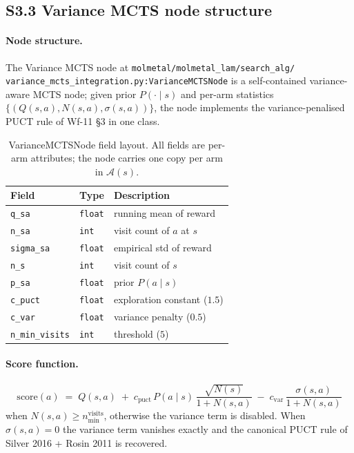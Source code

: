\subsection*{S3.3 Variance MCTS node structure}
\label{supp:s3-variance-mcts}

\paragraph{Node structure.}
The Variance MCTS node at
\texttt{molmetal/molmetal\_lam/search\_alg/
variance\_mcts\_integration.py:VarianceMCTSNode} is a
self-contained variance-aware MCTS node; given prior
$P(\cdot \mid s)$ and per-arm statistics
$\{(Q(s, a), N(s, a), \sigma(s, a))\}$, the node implements the
variance-penalised PUCT rule of Wf-11 \S 3 in one class.

\begin{table}[h]
  \centering
  \small
  \caption{VarianceMCTSNode field layout.  All fields are per-arm
  attributes; the node carries one copy per arm in $\mathcal{A}(s)$.}
  \label{tab:variance-mcts-fields}
  \begin{tabular}{lll}
    \toprule
    \textbf{Field} & \textbf{Type} & \textbf{Description} \\
    \midrule
    \texttt{q\_sa} & \texttt{float} & running mean of reward \\
    \texttt{n\_sa} & \texttt{int} & visit count of $a$ at $s$ \\
    \texttt{sigma\_sa} & \texttt{float} & empirical std of reward \\
    \texttt{n\_s} & \texttt{int} & visit count of $s$ \\
    \texttt{p\_sa} & \texttt{float} & prior $P(a \mid s)$ \\
    \texttt{c\_puct} & \texttt{float} & exploration constant ($1.5$) \\
    \texttt{c\_var} & \texttt{float} & variance penalty ($0.5$) \\
    \texttt{n\_min\_visits} & \texttt{int} & threshold ($5$) \\
    \bottomrule
  \end{tabular}
\end{table}

\paragraph{Score function.}
\begin{equation}
  \label{eq:variance-puct-score}
  \mathrm{score}(a) \;=\; Q(s, a)
        \;+\; c_{\mathrm{puct}}\, P(a \mid s)\,
                  \frac{ \sqrt{N(s)} }{ 1 + N(s, a) }
        \;-\; c_{\mathrm{var}}\, \frac{ \sigma(s, a) }
                                       { 1 + N(s, a) }
\end{equation}
when $N(s, a) \ge n_{\mathrm{min}}^{\mathrm{visits}}$, otherwise
the variance term is disabled.  When $\sigma(s, a) = 0$ the
variance term vanishes exactly and the canonical PUCT rule of
Silver 2016 + Rosin 2011 is recovered.

